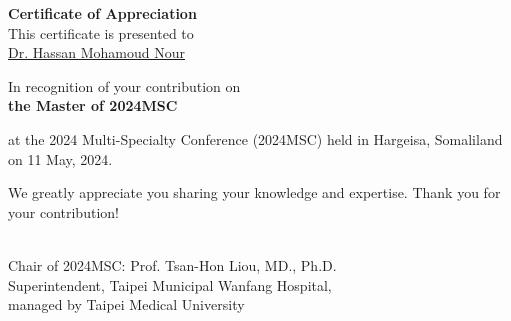 \documentclass[a4paper, landscape]{article}
\begin{document}
\begin{center}

{\Huge\textbf{Certificate of Appreciation}}\\[0.6cm]

\raisebox{-0.6\height}{}  \hspace{0.3cm}
This certificate is presented to \hspace{0.3cm}
\raisebox{-0.6\height}{} \\[0.4cm]

{\Huge\underline{Dr. Hassan Mohamoud Nour}}\\[0.2cm]



\begin{flushleft}
\Large



\vspace{0.5cm}

In recognition of your contribution on\\

\textbf{the Master of 2024MSC}

\vspace{0.5cm} 

at the 2024 Multi-Specialty Conference (2024MSC) held in Hargeisa, Somaliland on 11 May, 2024.


We greatly appreciate you sharing your knowledge and expertise. Thank you for your contribution!

\end{flushleft}\\[0.5cm]



\large
Chair of 2024MSC: Prof. Tsan-Hon Liou, MD., Ph.D.\\
Superintendent, Taipei Municipal Wanfang Hospital, \\
managed by Taipei Medical University

\end{center}
\end{document}
